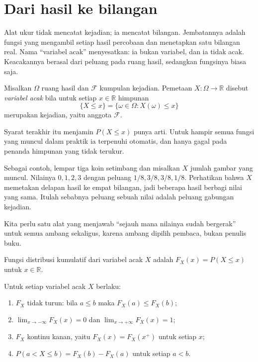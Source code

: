 \section{Dari hasil ke bilangan}

Alat ukur tidak mencatat kejadian; ia mencatat bilangan. Jembatannya adalah fungsi
yang mengambil setiap hasil percobaan dan menetapkan satu bilangan real. Nama
``variabel acak'' menyesatkan: ia bukan variabel, dan ia tidak acak. Keacakannya
berasal dari peluang pada ruang hasil, sedangkan fungsinya biasa saja.

\begin{definisi}
Misalkan $\Omega$ ruang hasil dan $\mathcal{F}$ kumpulan kejadian. Pemetaan
$X:\Omega\to\mathbb{R}$ disebut \emph{variabel acak} bila untuk setiap $x\in\mathbb{R}$
himpunan
\[
\{X\le x\}=\{\omega\in\Omega : X(\omega)\le x\}
\]
merupakan kejadian, yaitu anggota $\mathcal{F}$.
\end{definisi}

Syarat terakhir itu menjamin $P(X\le x)$ punya arti. Untuk hampir semua fungsi yang
muncul dalam praktik ia terpenuhi otomatis, dan hanya gagal pada penanda himpunan yang
tidak terukur.

Sebagai contoh, lempar tiga koin setimbang dan misalkan $X$ jumlah gambar yang muncul.
Nilainya $0,1,2,3$ dengan peluang $1/8,3/8,3/8,1/8$. Perhatikan bahwa $X$ memetakan
delapan hasil ke empat bilangan, jadi beberapa hasil berbagi nilai yang sama. Itulah
sebabnya peluang sebuah nilai adalah peluang gabungan kejadian.

Kita perlu satu alat yang menjawab ``sejauh mana nilainya sudah bergerak'' untuk semua
ambang sekaligus, karena ambang dipilih pembaca, bukan penulis buku.

\begin{definisi}
Fungsi distribusi kumulatif dari variabel acak $X$ adalah
$F_X(x)=P(X\le x)$ untuk $x\in\mathbb{R}$.
\end{definisi}

\begin{proposisi}
Untuk setiap variabel acak $X$ berlaku:
\begin{enumerate}
  \item $F_X$ tidak turun: bila $a\le b$ maka $F_X(a)\le F_X(b)$;
  \item $\lim_{x\to-\infty}F_X(x)=0$ dan $\lim_{x\to+\infty}F_X(x)=1$;
  \item $F_X$ kontinu kanan, yaitu $F_X(x)=F_X(x^+)$ untuk setiap $x$;
  \item $P(a<X\le b)=F_X(b)-F_X(a)$ untuk setiap $a<b$.
\end{enumerate}
\end{proposisi}


